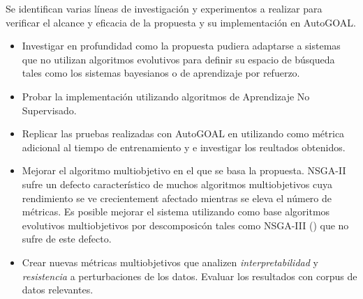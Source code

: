 \begin{recomendations}
Se identifican varias l\'ineas de investigaci\'on y experimentos a realizar para verificar el alcance y eficacia de la propuesta y su implementaci\'on en AutoGOAL.
\begin{itemize}
    \item Investigar en profundidad  como la propuesta pudiera adaptarse a sistemas que no utilizan algoritmos evolutivos para definir su espacio de b\'usqueda tales como los sistemas bayesianos o de aprendizaje por refuerzo.
    \item Probar la implementaci\'on utilizando algoritmos de Aprendizaje No Supervisado.
    \item Replicar las pruebas realizadas con AutoGOAL en \cite{estevez2020solving} utilizando como m\'etrica adicional al tiempo de entrenamiento y e investigar los reultados obtenidos. 
    \item Mejorar el algoritmo multiobjetivo en el que se basa la propuesta. NSGA-II sufre un defecto caracter\'istico de muchos algoritmos multiobjetivos cuya rendimiento se ve crecientement afectado mientras se eleva el n\'umero de m\'etricas. Es posible mejorar el sistema utilizando como base algoritmos evolutivos multiobjetivos por descomposic\'on tales como NSGA-III (\cite{deb2013evolutionary}) que no sufre de este defecto.
    
    \item Crear nuevas m\'etricas multiobjetivos que analizen \textit{interpretabilidad} y \textit{resistencia} a perturbaciones de los datos. Evaluar los resultados con corpus de datos relevantes.
\end{itemize}

\end{recomendations}
